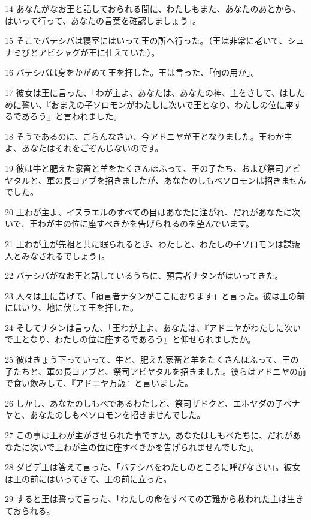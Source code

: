 \par 14 あなたがなお王と話しておられる間に、わたしもまた、あなたのあとから、はいって行って、あなたの言葉を確認しましょう」。
\par 15 そこでバテシバは寝室にはいって王の所へ行った。（王は非常に老いて、シュナミびとアビシャグが王に仕えていた）。
\par 16 バテシバは身をかがめて王を拝した。王は言った、「何の用か」。
\par 17 彼女は王に言った、「わが主よ、あなたは、あなたの神、主をさして、はしために誓い、『おまえの子ソロモンがわたしに次いで王となり、わたしの位に座するであろう』と言われました。
\par 18 そうであるのに、ごらんなさい、今アドニヤが王となりました。王わが主よ、あなたはそれをごぞんじないのです。
\par 19 彼は牛と肥えた家畜と羊をたくさんほふって、王の子たち、および祭司アビヤタルと、軍の長ヨアブを招きましたが、あなたのしもべソロモンは招きませんでした。
\par 20 王わが主よ、イスラエルのすべての目はあなたに注がれ、だれがあなたに次いで、王わが主の位に座すべきかを告げられるのを望んでいます。
\par 21 王わが主が先祖と共に眠られるとき、わたしと、わたしの子ソロモンは謀叛人とみなされるでしょう」。
\par 22 バテシバがなお王と話しているうちに、預言者ナタンがはいってきた。
\par 23 人々は王に告げて、「預言者ナタンがここにおります」と言った。彼は王の前にはいり、地に伏して王を拝した。
\par 24 そしてナタンは言った、「王わが主よ、あなたは、『アドニヤがわたしに次いで王となり、わたしの位に座するであろう』と仰せられましたか。
\par 25 彼はきょう下っていって、牛と、肥えた家畜と羊をたくさんほふって、王の子たちと、軍の長ヨアブと、祭司アビヤタルを招きました。彼らはアドニヤの前で食い飲みして、『アドニヤ万歳』と言いました。
\par 26 しかし、あなたのしもべであるわたしと、祭司ザドクと、エホヤダの子ベナヤと、あなたのしもべソロモンを招きませんでした。
\par 27 この事は王わが主がさせられた事ですか。あなたはしもべたちに、だれがあなたに次いで王わが主の位に座すべきかを告げられませんでした」。
\par 28 ダビデ王は答えて言った、「バテシバをわたしのところに呼びなさい」。彼女は王の前にはいってきて、王の前に立った。
\par 29 すると王は誓って言った、「わたしの命をすべての苦難から救われた主は生きておられる。
